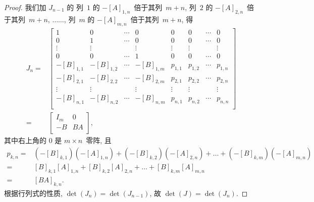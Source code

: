 \begin{proof}
    我们加 \(J_{n-1}\) 的%
    列~\(1\) 的 \(-[A]_{1,n}\)~倍于其列~\(m+n\),
    列~\(2\) 的 \(-[A]_{2,n}\)~倍于其列~\(m+n\),
    \(\dots \dots\),
    列~\(m\) 的 \(-[A]_{m,n}\)~倍于其列~\(m+n\),
    得
    \begin{align*}
        J_n
        = {} &
        \begin{bmatrix}
            1          & 0          & \cdots & 0          &
            0          & 0          & \cdots & 0            \\
            0          & 1          & \cdots & 0          &
            0          & 0          & \cdots & 0            \\
            \vdots     & \vdots     & {}     & \vdots     &
            \vdots     & \vdots     & {}     & \vdots       \\
            0          & 0          & \cdots & 1          &
            0          & 0          & \cdots & 0            \\
            -[B]_{1,1} & -[B]_{1,2} & \cdots & -[B]_{1,m} &
            p_{1,1}    & p_{1,2}    & \cdots & p_{1,n}      \\
            -[B]_{2,1} & -[B]_{2,2} & \cdots & -[B]_{2,m} &
            p_{2,1}    & p_{2,2}    & \cdots & p_{2,n}      \\
            \vdots     & \vdots     & {}     & \vdots     &
            \vdots     & \vdots     & {}     & \vdots       \\
            -[B]_{n,1} & -[B]_{n,2} & \cdots & -[B]_{n,m} &
            p_{n,1}    & p_{n,2}    & \cdots & p_{n,n}      \\
        \end{bmatrix}
        \\
        = {} &
        \begin{bmatrix}
            I_m & 0  \\
            -B  & BA \\
        \end{bmatrix},
    \end{align*}
    其中右上角的 \(0\) 是 \(m \times n\)~零阵,
    且
    \begin{align*}
        p_{k,n}
        = {} &
        (-[B]_{k,1})(-[A]_{1,n})
        + (-[B]_{k,2})(-[A]_{2,n})
        + \dots
        + (-[B]_{k,m})(-[A]_{m,n})
        \\
        = {} &
        [B]_{k,1} [A]_{1,n}
        + [B]_{k,2} [A]_{2,n}
        + \dots
        + [B]_{k,m} [A]_{m,n}
        \\
        = {} &
        [BA]_{k,n}.
    \end{align*}
    根据行列式的性质,
    \(\det {(J_n)} = \det {(J_{n-1})}\),
    故
    \(\det {(J)} = \det {(J_n)}\).


\end{proof}
